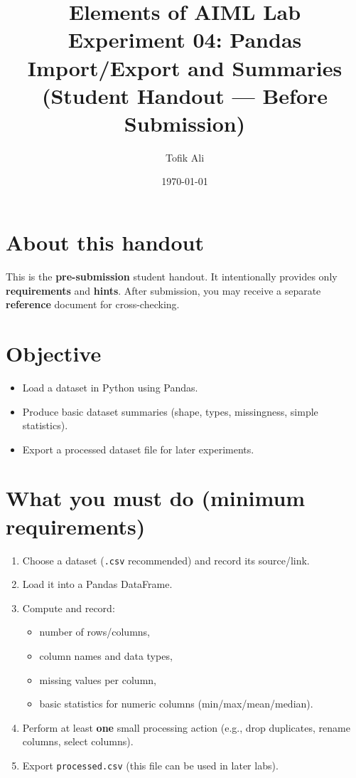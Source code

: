 \documentclass[11pt]{article}
\title{Elements of AIML Lab\\Experiment 04: Pandas Import/Export and Summaries (Student Handout — Before Submission)}
\author{Tofik Ali}
\date{\today}
\begin{document}
\maketitle
\tableofcontents

\section{About this handout}
This is the \textbf{pre-submission} student handout.
It intentionally provides only \textbf{requirements} and \textbf{hints}.
After submission, you may receive a separate \textbf{reference} document for cross-checking.

\section{Objective}
\begin{itemize}[leftmargin=*]
  \item Load a dataset in Python using Pandas.
  \item Produce basic dataset summaries (shape, types, missingness, simple statistics).
  \item Export a processed dataset file for later experiments.
\end{itemize}

\section{What you must do (minimum requirements)}
\begin{enumerate}[leftmargin=*]
  \item Choose a dataset (\texttt{.csv} recommended) and record its source/link.
  \item Load it into a Pandas DataFrame.
  \item Compute and record:
  \begin{itemize}[leftmargin=*]
    \item number of rows/columns,
    \item column names and data types,
    \item missing values per column,
    \item basic statistics for numeric columns (min/max/mean/median).
  \end{itemize}
  \item Perform at least \textbf{one} small processing action (e.g., drop duplicates, rename columns, select columns).
  \item Export \texttt{processed.csv} (this file can be used in later labs).
\end{enumerate}
\end{document}
